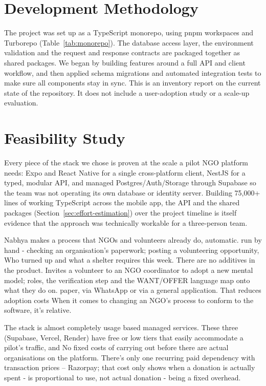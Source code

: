 \section{Development Methodology}
The project was set up as a TypeScript monorepo, using pnpm workspaces and Turborepo (Table~\ref{tab:monorepo}). The database access layer, the environment validation and the request and response contracts are packaged together as shared packages. We began by building features around a full API and client workflow, and then applied schema migrations and automated integration tests to make sure all components stay in sync. This is an inventory report on the current state of the repository. It does not include a user-adoption study or a scale-up evaluation.

\section{Feasibility Study}
\label{sec:feasibility}
\begin{description}[leftmargin=0pt, itemindent=0pt, labelsep=0.4em, font=\bfseries]
  \item[Technical feasibility:] Every piece of the stack we chose is proven at the scale a pilot NGO platform needs: Expo and React Native for a single cross-platform client, NestJS for a typed, modular API, and managed Postgres/Auth/Storage through Supabase so the team was not operating its own database or identity server. Building 75{,}000+ lines of working TypeScript across the mobile app, the API and the shared packages (Section~\ref{sec:effort-estimation}) over the project timeline is itself evidence that the approach was technically workable for a three-person team.
  \item[Operational feasibility:]Nabhya makes a process that NGOs and volunteers already do, automatic. run by hand - checking an organisation's paperwork; posting a volunteering opportunity, Who turned up and what a shelter requires this week. There are no additives in the product. Invites a volunteer to an NGO coordinator to adopt a new mental model; roles, the verification step and the WANT/OFFER language map onto what they do on. paper, via WhatsApp or via a general application. That reduces adoption costs When it comes to changing an NGO's process to conform to the software, it's relative.
  \item[Economic feasibility:] The stack is almost completely usage based managed services. These three (Supabase, Vercel, Render) have free or low tiers that easily accommodate a pilot's traffic, and No fixed costs of carrying out before there are actual organisations on the platform. There's only one recurring paid dependency with transaction prices – Razorpay; that cost only shows when a donation is actually spent - is proportional to use, not actual donation - being a fixed overhead.
\end{description}

